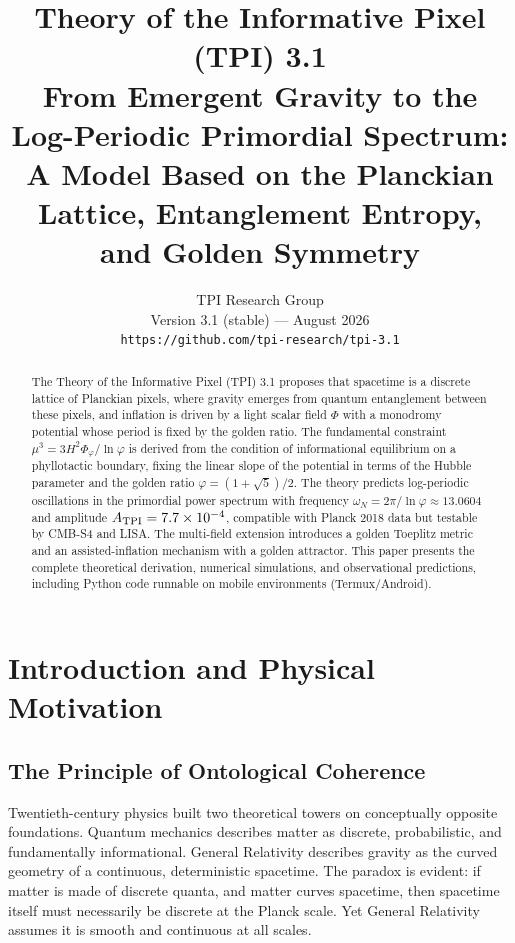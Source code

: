 \documentclass[11pt,a4paper]{article}
\title{\textbf{Theory of the Informative Pixel (TPI) 3.1}\\[0.3em]
\large From Emergent Gravity to the Log-Periodic Primordial Spectrum:\\
A Model Based on the Planckian Lattice, Entanglement Entropy, and Golden Symmetry}
\author{TPI Research Group\\
Version 3.1 (stable) --- August 2026\\
\texttt{https://github.com/tpi-research/tpi-3.1}}
\date{}
\theoremstyle{definition}
\begin{document}
\maketitle

\begin{abstract}
\noindent
The Theory of the Informative Pixel (TPI) 3.1 proposes that spacetime is a discrete lattice of Planckian pixels, where gravity emerges from quantum entanglement between these pixels, and inflation is driven by a light scalar field $\Phi$ with a monodromy potential whose period is fixed by the golden ratio. The fundamental constraint $\mu^3 = 3H^2\Phi_\varphi/\ln\varphi$ is derived from the condition of informational equilibrium on a phyllotactic boundary, fixing the linear slope of the potential in terms of the Hubble parameter and the golden ratio $\varphi=(1+\sqrt{5})/2$. The theory predicts log-periodic oscillations in the primordial power spectrum with frequency $\omega_N = 2\pi/\ln\varphi \approx 13.0604$ and amplitude $A_{\rm TPI} = 7.7\times 10^{-4}$, compatible with Planck 2018 data but testable by CMB-S4 and LISA. The multi-field extension introduces a golden Toeplitz metric and an assisted-inflation mechanism with a golden attractor. This paper presents the complete theoretical derivation, numerical simulations, and observational predictions, including Python code runnable on mobile environments (Termux/Android).
\end{abstract}

\tableofcontents
\newpage

\section{Introduction and Physical Motivation}\label{sec:intro}

\subsection{The Principle of Ontological Coherence}

Twentieth-century physics built two theoretical towers on conceptually opposite foundations. Quantum mechanics describes matter as discrete, probabilistic, and fundamentally informational. General Relativity describes gravity as the curved geometry of a continuous, deterministic spacetime. The paradox is evident: if matter is made of discrete quanta, and matter curves spacetime, then spacetime itself must necessarily be discrete at the Planck scale. Yet General Relativity assumes it is smooth and continuous at all scales.
\end{document}
